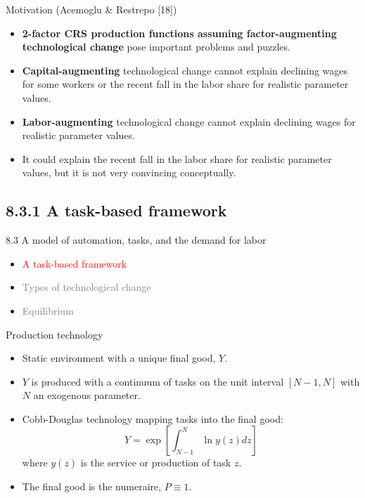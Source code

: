 \documentclass[notes=show]{beamer}
\begin{document}
\begin{frame}{Motivation (Acemoglu \& Restrepo [18])}
\begin{itemize}
\item \textbf{2-factor CRS production functions assuming factor-augmenting technological change} pose important problems and puzzles. \medskip
\item \textbf{Capital-augmenting} technological change cannot explain declining wages for some workers or the recent fall in the labor share for realistic parameter values. \medskip
\item \textbf{Labor-augmenting} technological change cannot explain declining wages for realistic parameter values. \medskip
\item It could explain the recent fall in the labor share for realistic parameter values, but it is not very convincing conceptually.
\end{itemize}
\end{frame}

\subsection{8.3.1 A task-based framework}

\begin{frame}{8.3 A model of automation, tasks, and the demand for labor}
\begin{itemize}
\item[\textcolor{red}{8.3.1}] \textcolor{red}{A task-based framework} \bigskip
\item[\textcolor{gray}{8.3.2}] \textcolor{gray}{Types of technological change} \bigskip
\item[\textcolor{gray}{8.3.3}] \textcolor{gray}{Equilibrium}
\end{itemize}
\end{frame}

\begin{frame}{Production technology}
\begin{itemize}
\item Static environment with a unique final good, $Y$. \medskip
\item $Y$ is produced with a continuum of tasks on the unit interval $[N-1,N]$ with $N$ an exogenous parameter. \medskip
\item Cobb-Douglas technology mapping tasks into the final good:
\[
Y= \exp \left[ \int_{N-1}^{N} \ln y(z)dz \right] \tag{1}  \label{eq1}
\]
where $y(z)$ is the service or production of task $z$. \medskip
\item The final good is the numeraire, $P \equiv 1$.
\end{itemize}
\end{frame}
\end{document}
